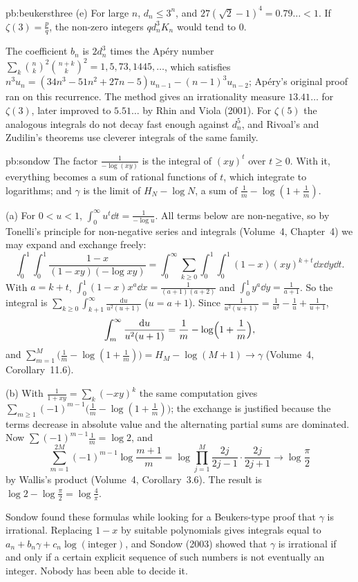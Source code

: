 \begin{solution}{pb:beukersthree}
(e) For large $n$, $d_n\le3^n$, and $27(\sqrt2-1)^4=0.79\ldots<1$. If $\zeta(3)=\frac pq$, the non-zero integers $qd_n^3K_n$ would tend to $0$.

\leads The coefficient $b_n$ is $2d_n^3$ times the Apéry number $\sum_k\binom nk^2\binom{n+k}k^2=1,5,73,1445,\dots$, which satisfies
$n^3u_n=(34n^3-51n^2+27n-5)u_{n-1}-(n-1)^3u_{n-2}$; Apéry's original proof ran on this recurrence. The method gives an irrationality
measure $13.41\ldots$ for $\zeta(3)$, later improved to $5.51\ldots$ by Rhin and Viola (2001). For $\zeta(5)$ the analogous integrals do
not decay fast enough against $d_n^5$, and Rivoal's and Zudilin's theorems use cleverer integrals of the same family.
\end{solution}

\begin{solution}{pb:sondow}
\idea The factor $\frac1{-\log(xy)}$ is the integral of $(xy)^t$ over $t\ge0$. With it, everything becomes a sum of rational
functions of $t$, which integrate to logarithms; and $\gamma$ is the limit of $H_N-\log N$, a sum of $\frac1m-\log(1+\frac1m)$.

\writeup (a) For $0<u<1$, $\int_0^\infty u^t\dd t=\frac1{-\log u}$. All terms below are non-negative, so by Tonelli's principle for
non-negative series and integrals (Volume~4, Chapter~4) we may expand and exchange freely:
\[
\int_0^1\!\!\int_0^1\frac{1-x}{(1-xy)(-\log xy)}=\int_0^\infty\sum_{k\ge0}\int_0^1\!\!\int_0^1(1-x)(xy)^{k+t}\dd x\dd y\dd t.
\]
With $a=k+t$, $\int_0^1(1-x)x^a\dd x=\frac1{(a+1)(a+2)}$ and $\int_0^1y^a\dd y=\frac1{a+1}$. So the integral is
$\sum_{k\ge0}\int_{k+1}^\infty\frac{\mathrm du}{u^2(u+1)}$ ($u=a+1$). Since $\frac1{u^2(u+1)}=\frac1{u^2}-\frac1u+\frac1{u+1}$,
\[
\int_m^\infty\frac{\mathrm du}{u^2(u+1)}=\frac1m-\log\Bigl(1+\frac1m\Bigr),
\]
and $\sum_{m=1}^M\bigl(\frac1m-\log(1+\frac1m)\bigr)=H_M-\log(M+1)\to\gamma$ (Volume~4, Corollary~11.6).

(b) With $\frac1{1+xy}=\sum_k(-xy)^k$ the same computation gives $\sum_{m\ge1}(-1)^{m-1}\bigl(\frac1m-\log(1+\frac1m)\bigr)$; the exchange is justified
because the terms decrease in absolute value and the alternating partial sums are dominated. Now $\sum(-1)^{m-1}\frac1m=\log2$, and
\[
\sum_{m=1}^{2M}(-1)^{m-1}\log\frac{m+1}m=\log\prod_{j=1}^M\frac{2j}{2j-1}\cdot\frac{2j}{2j+1}\longrightarrow\log\frac\pi2
\]
by Wallis's product (Volume~4, Corollary~3.6). The result is $\log2-\log\frac\pi2=\log\frac4\pi$.

\leads Sondow found these formulas while looking for a Beukers-type proof that $\gamma$ is irrational. Replacing $1-x$ by suitable
polynomials gives integrals equal to $a_n+b_n\gamma+c_n\log(\text{integer})$, and Sondow (2003) showed that $\gamma$ is irrational if and
only if a certain explicit sequence of such numbers is not eventually an integer. Nobody has been able to decide it.
\end{solution}

